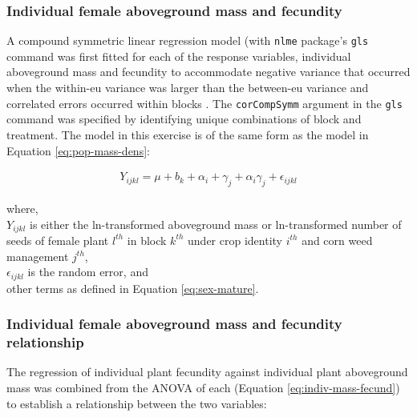 \documentclass[utf8]{frontiersSCNS}
\begin{document}
\hypertarget{individual-female-aboveground-mass-and-fecundity-1}{%
\subsubsection*{Individual female aboveground mass and fecundity}\label{individual-female-aboveground-mass-and-fecundity-1}}

A compound symmetric linear regression model (with \texttt{nlme} package's \texttt{gls} command was first fitted for each of the response variables, individual aboveground mass and fecundity to accommodate negative variance that occurred when the within-eu variance was larger than the between-eu variance and correlated errors occurred within blocks \citep[version 3.1-153,][]{pinheroNlmeLinearNonlinear2021}.
The \texttt{corCompSymm} argument in the \texttt{gls} command was specified by identifying unique combinations of block and treatment. The model in this exercise is of the same form as the model in Equation \eqref{eq:pop-mass-dens}:

\begin{align}
Y_{ijkl} = \mu + b_k + \alpha_i + \gamma_j +\alpha_i \gamma_j + \epsilon_{ijkl} \label{eq:indiv-mass-fecund}
\end{align}

where,\\
\(Y_{ijkl}\) is either the ln-transformed aboveground mass or ln-transformed number of seeds of female plant \(l^{th}\) in block \(k^{th}\) under crop identity \(i^{th}\) and corn weed management \(j^{th}\),\\
\(\epsilon_{ijkl}\) is the random error, and \\
other terms as defined in Equation \eqref{eq:sex-mature}.

\hypertarget{individual-female-aboveground-mass-and-fecundity-relationship}{%
\subsubsection*{Individual female aboveground mass and fecundity relationship}\label{individual-female-aboveground-mass-and-fecundity-relationship}}

The regression of individual plant fecundity against individual plant aboveground mass was combined from the ANOVA of each (Equation \eqref{eq:indiv-mass-fecund}) to establish a relationship between the two variables:
\end{document}

